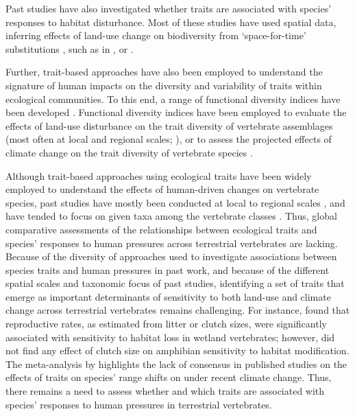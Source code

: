Past studies have also investigated whether traits are associated with species' responses to habitat disturbance. Most of these studies have used spatial data, inferring effects of land-use change on biodiversity from `space-for-time' substitutions \citep{DePalma2018, Davison2021}, such as in \citet{Newbold2013}, \citet{Quesnelle2014} or \citet{Nowakowski2017}.

Further, trait-based approaches have also been employed to understand the signature of human impacts on the diversity and variability of traits within ecological communities. To this end, a range of functional diversity indices have been developed \citep{Schleuter2010a, Legras2018}. Functional diversity indices have been employed to evaluate the effects of land-use disturbance on the trait diversity of vertebrate assemblages (most often at local and regional scales; \citet{Flynn2009, LaSorte2018, Tinoco2018}), or to assess the projected effects of climate change on the trait diversity of vertebrate species \citep{Stewart2022}.

Although trait-based approaches using ecological traits have been widely employed to understand the effects of human-driven changes on vertebrate species, past studies have mostly been conducted at local to regional scales \citep{Davison2021}, and have tended to focus on given taxa among the vertebrate classes \citep{Hevia2017}. Thus, global comparative assessments of the relationships between ecological traits and species' responses to human pressures across terrestrial vertebrates are lacking. Because of the diversity of approaches used to investigate associations between species traits and human pressures in past work, and because of the different spatial scales and taxonomic focus of past studies, identifying a set of traits that emerge as important determinants of sensitivity to both land-use and climate change across terrestrial vertebrates remains challenging. For instance, \citet{Quesnelle2014} found that reproductive rates, as estimated from litter or clutch sizes, were significantly associated with sensitivity to habitat loss in wetland vertebrates; however, \citet{Nowakowski2017} did not find any effect of clutch size on amphibian sensitivity to habitat modification. The meta-analysis by \citet{MacLean2017} highlights the lack of consensus in published studies on the effects of traits on species' range shifts on under recent climate change.
Thus, there remains a need to assess whether and which traits are associated with species' responses to human pressures in terrestrial vertebrates. 

